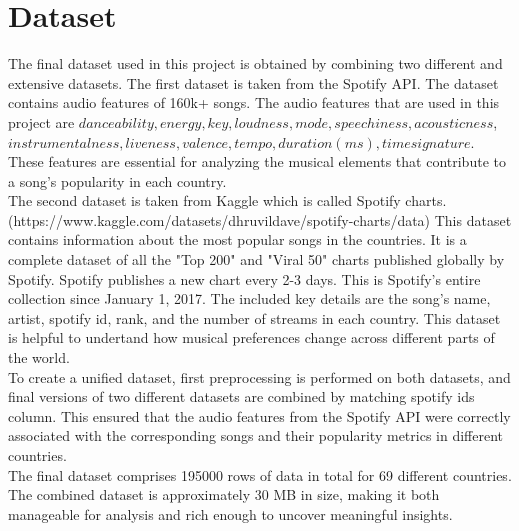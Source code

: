 \section{Dataset}
The final dataset used in this project is obtained by combining two different and extensive datasets.
The first dataset is taken from the Spotify API. The dataset contains audio features of 160k+ songs. The audio features that are used in this project are $danceability, energy, key, loudness, mode, speechiness, acousticness$, 
$instrumentalness, liveness, valence, tempo, duration (ms), time signature$.  
These features are essential for analyzing the musical elements that contribute to a song's popularity in each country.\\
The second dataset is taken from Kaggle which is called Spotify charts. 
(https://www.kaggle.com/datasets/dhruvildave/spotify-charts/data)
This dataset contains information about the most popular songs in the countries. It is a complete dataset 
of all the "Top 200" and "Viral 50" charts published globally by Spotify. Spotify publishes a new chart
 every 2-3 days. This is Spotify's entire collection since January 1, 2017.
 The included key details are the song's name, artist, spotify id, rank, and the number of streams 
 in each country. This dataset is helpful to undertand how musical preferences change across different
 parts of the world. \\
 To create a unified dataset, first preprocessing is performed on both datasets, and final versions of two different 
 datasets are combined by matching spotify ids column. This ensured that the audio features from the Spotify API were 
 correctly associated with the corresponding songs and their popularity metrics in different countries.\\
 The final dataset comprises 195000 rows of data in total for 69 different countries. The combined
 dataset is approximately 30 MB in size, making it both manageable for analysis and rich enough to uncover 
 meaningful insights.\\